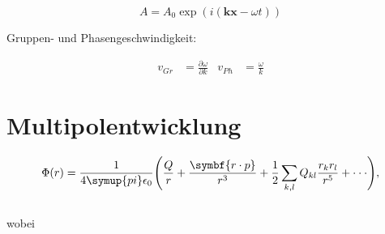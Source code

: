 \documentclass{scrartcl}
\begin{document}
\begin{equation}
  A=A_0\exp (i({\symbf{kx}-\omega t}))  %
\end{equation}

Gruppen- und Phasengeschwindigkeit:

\begin{align}
  v_{Gr} &=\frac{\partial\omega}{\partial k} &
  v_{Ph} &= \frac{\omega}{k}
\end{align}

\section{Multipolentwicklung}
\begin{equation}
  \Phi(r) = \frac{1}{4\symup{pi}\epsilon_0}\Biggl(\frac{Q}{r} +
  \frac{\symbf{r\cdot p}} {r^3} + \frac{1}{2} \sum_{k,l}
  Q_{kl}\frac{r_k r_l}{r^5} + \cdot\cdot\cdot \Biggr),
\end{equation} \\
wobei
\end{document}
